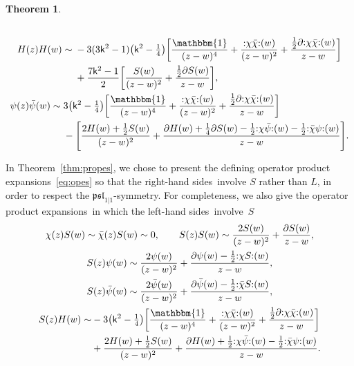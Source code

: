 \documentclass[10pt,a4paper]{amsart}
\numberwithin{equation}{section}
\newcommand{\pd}{\partial} %
\newcommand{\wun}{\mathbbm{1}} %
\newcommand{\bchi}{\bar{\chi}{}} %
\newcommand{\bpsi}{\bar{\psi}{}} %
\newcommand{\kk}{\mathsf{k}} %
\DeclarePairedDelimiter{\brac}{\lparen}{\rparen} %
\DeclarePairedDelimiter{\sqbrac}{\lbrack}{\rbrack} %
\newcommand{\no}[1]{\mathopen{:} #1 \mathclose{:}} %
\newcommand{\alg}[1]{\mathfrak{#1}} %
\newcommand{\SLSA}[3]{\alg{#1}_{#2 \vert #3}} %
\newcommand{\pslone}{\SLSA{psl}{1}{1}}
\newcommand{\lhs}{left-hand side}
\newcommand{\lhss}{\lhs s}
\newcommand{\rhs}{right-hand side}
\newcommand{\rhss}{\rhs s}
\newcommand{\ope}{operator product expansion}
\newcommand{\opes}{\ope s}
\newtheorem{Theorem}{Theorem}[section]
\begin{document}
\begin{Theorem}
\begin{subequations}
\begin{gather}
\begin{aligned}
			\end{aligned}
			\\
			\begin{aligned}
				H(z) H(w) \sim{} & -3(3\kk^2-1)\brac*{\kk^2-\tfrac{1}{4}} \sqbrac*{\frac{\wun}{(z-w)^4} + \frac{\no{\chi\bchi}(w)}{(z-w)^2} + \frac{\frac{1}{2}\pd\no{\chi\bchi}(w)}{z-w}} \\
				& + \frac{7\kk^2-1}{2} \sqbrac*{\frac{S(w)}{(z-w)^2} + \frac{\frac{1}{2}\pd S(w)}{z-w}},
			\end{aligned}
			\\
			\begin{aligned}
				\psi(z) \bpsi(w) \sim{} & 3\brac*{\kk^2-\tfrac{1}{4}} \sqbrac*{\frac{\wun}{(z-w)^4} + \frac{\no{\chi\bchi}(w)}{(z-w)^2} + \frac{\frac{1}{2}\pd\no{\chi\bchi}(w)}{z-w}}
				\\
				& - \sqbrac*{\frac{2H(w)+\frac{1}{2}S(w)}{(z-w)^2} + \frac{\pd H(w)+\frac{1}{4}\pd S(w)-\frac{1}{2}\no{\chi\bpsi}(w)-\frac{1}{2}\no{\bchi\psi}(w)}{z-w}}.
			\end{aligned}
		\end{gather}
	\end{subequations}
\end{Theorem}

In Theorem~\ref{thm:propes}, we chose to present the defining \opes\ \eqref{eq:opes} so that the \rhss\ involve $S$ rather than $L$, in order to respect the $\pslone$-symmetry.
For completeness, we also give the \opes\ in which the \lhss\ involve~$S$%
\begin{subequations} \label{eq:opesS}
	\begin{gather}
		\chi(z) S(w) \sim \bchi(z) S(w) \sim 0, \qquad
		S(z) S(w) \sim \frac{2S(w)}{(z-w)^2} + \frac{\pd S(w)}{z-w},
		\\
		\begin{aligned}
			S(z) \psi(w) &\sim \frac{2\psi(w)}{(z-w)^2} + \frac{\pd\psi(w) - \frac{1}{2}\no{\chi S}(w)}{z-w}, \\
			S(z) \bpsi(w) &\sim \frac{2\bpsi(w)}{(z-w)^2} + \frac{\pd\bpsi(w) - \frac{1}{2}\no{\bchi S}(w)}{z-w},
		\end{aligned}
		\\
		\begin{aligned}[b]
			S(z) H(w) \sim& -3\brac*{\kk^2-\tfrac{1}{4}}\sqbrac*{\frac{\wun}{(z-w)^4} + \frac{\no{\chi\bchi}(w)}{(z-w)^2} + \frac{\frac{1}{2}\pd\no{\chi\bchi}(w)}{z-w}} \\
			&+ \frac{2H(w) + \frac{1}{2}S(w)}{(z-w)^2} + \frac{\pd H(w) + \frac{1}{2}\no{\chi\bpsi}(w) - \frac{1}{2}\no{\bchi\psi}(w)}{z-w}.
		\end{aligned}
	\end{gather}
\end{subequations}
\end{document}

